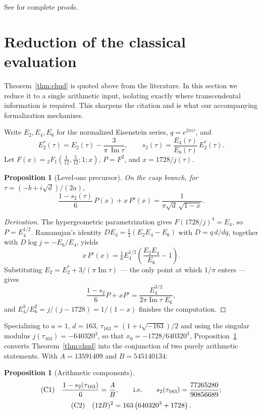 \documentclass[11pt]{article}
\newtheorem{proposition}[theorem]{Proposition}
\theoremstyle{remark}
\begin{document}
See \cite{Chudnovsky1988,BorweinBorwein1987,BaierBrendle2012}
for complete proofs.


\section{Reduction of the classical evaluation}
\label{sec:reduction}

Theorem~\ref{thm:chud} is quoted above from the literature.  In this
section we reduce it to a single arithmetic input, isolating exactly
where transcendental information is required.  This sharpens the
citation and is what our accompanying formalization mechanizes.

Write $E_2,E_4,E_6$ for the normalized Eisenstein series,
$q=e^{2\pi i\tau}$, and
\[
E_2^{*}(\tau)=E_2(\tau)-\frac{3}{\pi\,\operatorname{Im}\tau},
\qquad
s_2(\tau)=\frac{E_4(\tau)}{E_6(\tau)}\,E_2^{*}(\tau).
\]
Let $F(x)={}_2F_1\!\left(\tfrac1{12},\tfrac5{12};1;x\right)$,
$P=F^2$, and $x=1728/j(\tau)$.

\begin{proposition}[Level-one precursor]\label{prop:precursor}
On the cusp branch, for $\tau=(-b+i\sqrt d)/(2a)$,
\[
\frac{1-s_2(\tau)}{6}\,P(x)+x\,P'(x)
=\frac{1}{\pi\sqrt{d}\,\sqrt{1-x}} .
\]
\end{proposition}

\begin{proof}[Derivation]
The hypergeometric parametrization gives $F(1728/j)^4=E_4$, so
$P=E_4^{1/2}$.  Ramanujan's identity
$D E_4=\tfrac13(E_2E_4-E_6)$ with $D=q\,d/dq$, together with
$D\log j=-E_6/E_4$, yields
\[
x\,P'(x)=\tfrac16 E_4^{1/2}\!\left(\frac{E_2E_4}{E_6}-1\right).
\]
Substituting $E_2=E_2^{*}+3/(\pi\operatorname{Im}\tau)$ --- the only
point at which $1/\pi$ enters --- gives
\[
\frac{1-s_2}{6}P+xP'
=\frac{E_4^{3/2}}{2\pi\operatorname{Im}\tau\;E_6},
\]
and $E_4^3/E_6^2=j/(j-1728)=1/(1-x)$ finishes the computation.
\end{proof}

Specializing to $a=1$, $d=163$, $\tau_{163}=(1+i\sqrt{-163})/2$ and
using the singular modulus $j(\tau_{163})=-640320^3$, so that
$x_0=-1728/640320^3$, Proposition~\ref{prop:precursor} converts
Theorem~\ref{thm:chud} into the conjunction of two purely arithmetic
statements.  With $A=13591409$ and $B=545140134$:

\begin{proposition}[Arithmetic components]\label{prop:C1C2}
\[
\textup{(C1)}\quad \frac{1-s_2(\tau_{163})}{6}=\frac{A}{B},
\qquad\text{i.e.}\qquad
s_2(\tau_{163})=\frac{77265280}{90856689};
\]
\[
\textup{(C2)}\quad (12B)^2=163\left(640320^3+1728\right).
\]
\end{proposition}
\end{document}
